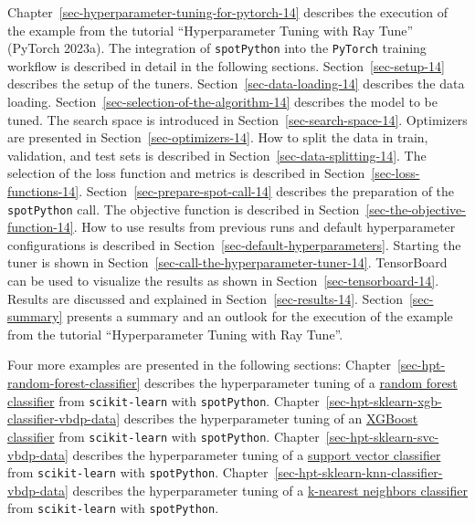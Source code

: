 \documentclass[
  letterpaper,
  DIV=11,
  numbers=noendperiod]{scrreprt}
\begin{document}
Chapter~\ref{sec-hyperparameter-tuning-for-pytorch-14} describes the
execution of the example from the tutorial ``Hyperparameter Tuning with
Ray Tune'' (PyTorch 2023a). The integration of \texttt{spotPython} into
the \texttt{PyTorch} training workflow is described in detail in the
following sections. Section~\ref{sec-setup-14} describes the setup of
the tuners. Section~\ref{sec-data-loading-14} describes the data
loading. Section~\ref{sec-selection-of-the-algorithm-14} describes the
model to be tuned. The search space is introduced in
Section~\ref{sec-search-space-14}. Optimizers are presented in
Section~\ref{sec-optimizers-14}. How to split the data in train,
validation, and test sets is described in
Section~\ref{sec-data-splitting-14}. The selection of the loss function
and metrics is described in Section~\ref{sec-loss-functions-14}.
Section~\ref{sec-prepare-spot-call-14} describes the preparation of the
\texttt{spotPython} call. The objective function is described in
Section~\ref{sec-the-objective-function-14}. How to use results from
previous runs and default hyperparameter configurations is described in
Section~\ref{sec-default-hyperparameters}. Starting the tuner is shown
in Section~\ref{sec-call-the-hyperparameter-tuner-14}. TensorBoard can
be used to visualize the results as shown in
Section~\ref{sec-tensorboard-14}. Results are discussed and explained in
Section~\ref{sec-results-14}. Section~\ref{sec-summary} presents a
summary and an outlook for the execution of the example from the
tutorial ``Hyperparameter Tuning with Ray Tune''.

Four more examples are presented in the following sections:
Chapter~\ref{sec-hpt-random-forest-classifier} describes the
hyperparameter tuning of a
\href{https://scikit-learn.org/stable/modules/generated/sklearn.ensemble.RandomForestClassifier.html}{random
forest classifier} from \texttt{scikit-learn} with \texttt{spotPython}.
Chapter~\ref{sec-hpt-sklearn-xgb-classifier-vbdp-data} describes the
hyperparameter tuning of an
\href{https://scikit-learn.org/stable/modules/ensemble.html\#histogram-based-gradient-boosting}{XGBoost
classifier} from \texttt{scikit-learn} with \texttt{spotPython}.
Chapter~\ref{sec-hpt-sklearn-svc-vbdp-data} describes the hyperparameter
tuning of a
\href{https://scikit-learn.org/stable/modules/generated/sklearn.svm.SVC.html\#sklearn.svm.SVC}{support
vector classifier} from \texttt{scikit-learn} with \texttt{spotPython}.
Chapter~\ref{sec-hpt-sklearn-knn-classifier-vbdp-data} describes the
hyperparameter tuning of a
\href{https://scikit-learn.org/stable/modules/generated/sklearn.neighbors.KNeighborsClassifier.html}{k-nearest
neighbors classifier} from \texttt{scikit-learn} with
\texttt{spotPython}.
\end{document}
